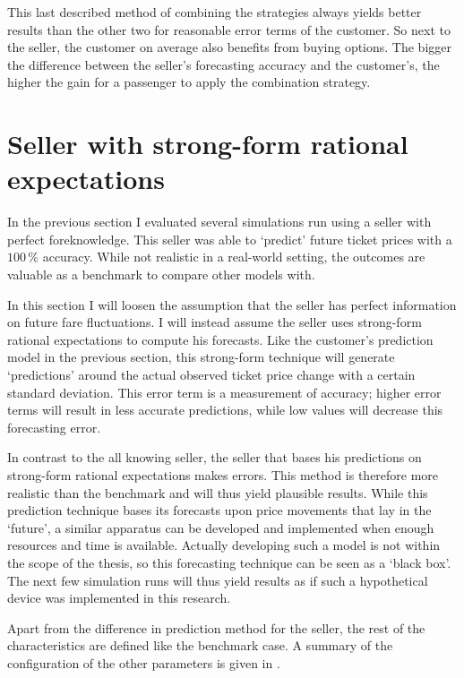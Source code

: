This last described method of combining the strategies always yields better results than the other two for reasonable error terms of the customer. So next to the seller, the customer on average also benefits from buying options. The bigger the difference between the seller's forecasting accuracy and the customer's, the higher the gain for a passenger to apply the combination strategy.



\section{Seller with strong-form rational expectations}
\label{sec:StrongWeak}
In the previous section I evaluated several simulations run using a seller with perfect foreknowledge. This seller was able to `predict' future ticket prices with a $100\,\%$ accuracy. While not realistic in a real-world setting, the outcomes are valuable as a benchmark to compare other models with.

In this section I will loosen the assumption that the seller has perfect information on future fare fluctuations. I will instead assume the seller uses strong-form rational expectations to compute his forecasts. Like the customer's prediction model in the previous section, this strong-form technique will generate `predictions' around the actual observed ticket price change with a certain standard deviation. This error term is a measurement of accuracy; higher error terms will result in less accurate predictions, while low values will decrease this forecasting error.

In contrast to the all knowing seller, the seller that bases his predictions on strong-form rational expectations makes errors. This method is therefore more realistic than the benchmark and will thus yield plausible results. While this prediction technique bases its forecasts upon price movements that lay in the `future', a similar apparatus can be developed and implemented when enough resources and time is available. Actually developing such a model is not within the scope of the thesis, so this forecasting technique can be seen as a `black box'. The next few simulation runs will thus yield results as if such a hypothetical device was implemented in this research.

Apart from the difference in prediction method for the seller, the rest of the characteristics are defined like the benchmark case. A summary of the configuration of the other parameters is given in .

